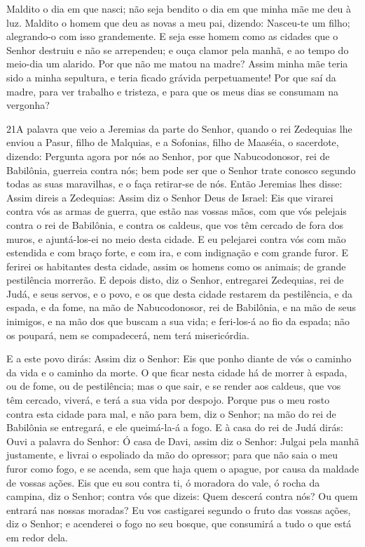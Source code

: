 Maldito o dia em que nasci; não seja bendito o dia em que minha
mãe me deu à luz. Maldito o homem que deu as novas a meu pai,
dizendo: Nasceu-te um filho; alegrando-o com isso grandemente.
E seja esse homem como as cidades que o Senhor destruiu e não
se arrependeu; e ouça clamor pela manhã, e ao tempo do meio-dia um
alarido. Por que não me matou na madre? Assim minha mãe teria
sido a minha sepultura, e teria ficado grávida perpetuamente!
Por que saí da madre, para ver trabalho e tristeza, e para
que os meus dias se consumam na vergonha?

\medskip

\lettrine{21} A palavra que veio a Jeremias da parte do
Senhor, quando o rei Zedequias lhe enviou a Pasur, filho de
Malquias, e a Sofonias, filho de Maaséia, o sacerdote, dizendo:
Pergunta agora por nós ao Senhor, por que Nabucodonosor, rei de
Babilônia, guerreia contra nós; bem pode ser que o Senhor trate
conosco segundo todas as suas maravilhas, e o faça retirar-se de
nós. Então Jeremias lhes disse: Assim direis a Zedequias:
Assim diz o Senhor Deus de Israel: Eis que virarei contra vós as
armas de guerra, que estão nas vossas mãos, com que vós pelejais
contra o rei de Babilônia, e contra os caldeus, que vos têm cercado
de fora dos muros, e ajuntá-los-ei no meio desta cidade. E eu
pelejarei contra vós com mão estendida e com braço forte, e com ira,
e com indignação e com grande furor. E ferirei os habitantes
desta cidade, assim os homens como os animais; de grande pestilência
morrerão. E depois disto, diz o Senhor, entregarei Zedequias,
rei de Judá, e seus servos, e o povo, e os que desta cidade restarem
da pestilência, e da espada, e da fome, na mão de Nabucodonosor, rei
de Babilônia, e na mão de seus inimigos, e na mão dos que buscam a
sua vida; e feri-los-á ao fio da espada; não os poupará, nem se
compadecerá, nem terá misericórdia.

E a este povo dirás: Assim diz o Senhor: Eis que ponho diante de
vós o caminho da vida e o caminho da morte. O que ficar nesta
cidade há de morrer à espada, ou de fome, ou de pestilência; mas o
que sair, e se render aos caldeus, que vos têm cercado, viverá, e
terá a sua vida por despojo. Porque pus o meu rosto contra
esta cidade para mal, e não para bem, diz o Senhor; na mão do rei de
Babilônia se entregará, e ele queimá-la-á a fogo. E à casa do
rei de Judá dirás: Ouvi a palavra do Senhor: Ó casa de Davi,
assim diz o Senhor: Julgai pela manhã justamente, e livrai o
espoliado da mão do opressor; para que não saia o meu furor como
fogo, e se acenda, sem que haja quem o apague, por causa da maldade
de vossas ações. Eis que eu sou contra ti, ó moradora do
vale, ó rocha da campina, diz o Senhor; contra vós que dizeis: Quem
descerá contra nós? Ou quem entrará nas nossas moradas? Eu
vos castigarei segundo o fruto das vossas ações, diz o Senhor; e
acenderei o fogo no seu bosque, que consumirá a tudo o que está em
redor dela.

